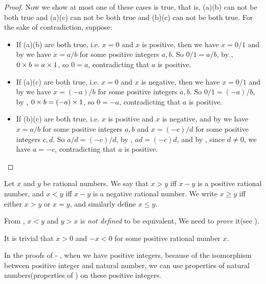 \begin{proof}
Now we show at most one of these cases is true, that is, (a)(b) can not be both true and (a)(c) can not be both true and (b)(c) can not be both true.
For the sake of contradiction, suppose:
\begin{itemize}
    \item
        If (a)(b) are both true, i.e. \(x = 0\) and \(x\) is positive, then we have \(x = 0/1\) and by  we have \(x = a / b\) for some positive integers \(a, b\).
        So \(0/1 = a/b\), by , \(0 \times b = a \times 1\), so \(0 = a\), contradicting that \(a\) is positive.
    \item
        If (a)(c) are both true, i.e. \(x = 0\) and \(x\) is negative, then we have \(x = 0/1\) and by  we have \(x = (-a) / b\) for some positive integers \(a, b\).
        So \(0/1 = (-a)/b\), by , \(0 \times b = (-a) \times 1\), so \(0 = -a\), contradicting that \(a\) is positive.
    \item
        If (b)(c) are both true, i.e. \(x\) is positive and \(x\) is negative, and by  we have \(x = a/b\) for some positive integers \(a, b\) and \(x = (-c)/d\) for some positive integers \(c, d\).
        So \(a/d = (-c)/d\), by , \(ad = (-c)d\), and by , since \(d \neq 0\), we have \(a = -c\), contradicting that \(a\) is positive.
\end{itemize}
\end{proof}

\begin{definition}  \label{def 4.2.8}
Let \(x\) and \(y\) be rational numbers.
We say that \(x > y\) iff \(x - y\) is a positive rational number,
and \(x < y\) iff \(x - y\) is a negative rational number.
We write \(x \ge y\) iff either \(x > y\) or \(x = y\), and similarly define \(x \le y\).
\end{definition}

\begin{note}
From , \(x < y\) and \(y > x\) is \emph{not defined} to be equivalent, We need to \emph{prove} it(see ).
\end{note}
\begin{note}
It is trivial that \(x > 0\) and \(-x < 0\) for some positive rational number \(x\).
\end{note}

\begin{note}
In the proofs of  - , when we have positive integers, because of the isomorphism between positive integer and natural number, we can use properties of natural numbers(properties of ) on these positive integers.
\end{note}

